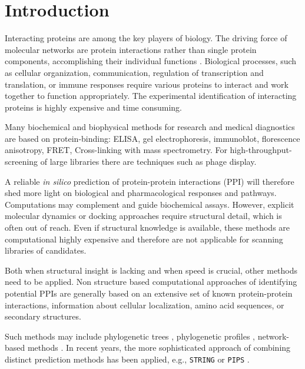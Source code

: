 \documentclass{bioinfo}
\begin{document}
\maketitle




\section{Introduction}

Interacting proteins are among the key players of biology. The driving
force of molecular networks are protein interactions rather than
single protein components, accomplishing their individual functions
\citep{Pawson:2004}. Biological processes, such as cellular
organization, communication, regulation of transcription and
translation, or immune responses require various proteins to interact
and work together to function appropriately. The experimental
identification of interacting proteins is highly expensive and time
consuming.

Many biochemical and biophysical methods for research and medical diagnostics are based on protein-binding:
ELISA,
gel electrophoresis, immunoblot, florescence anisotropy, FRET,
Cross-linking with mass spectrometry. For high-throughput-screening of
large libraries there are techniques such as phage display. 

A reliable \textit{in silico} prediction of protein-protein
interactions (PPI) will therefore shed more light on biological and
pharmacological responses and pathways. Computations may complement
and guide biochemical assays. However, explicit molecular dynamics or
docking approaches require structural detail, which is often out of
reach. Even if structural knowledge is available, these methods are
computational highly expensive and therefore are not applicable for
scanning libraries of candidates. 

Both when structural insight is lacking and when speed is crucial,
other methods need to be applied. Non structure based computational
approaches of identifying potential PPIs are generally based on an
extensive set of known protein-protein interactions, information about
cellular localization, amino acid sequences, or secondary structures.

Such methods may include phylogenetic trees \citep{Pazos:2001},
phylogenetic profiles \citep{Barker:2005}, network-based methods
\citep{Yook:2004, Clauset:2008}. In recent years, the more
sophisticated approach of combining distinct prediction methods has
been applied, e.g., \texttt{STRING} \citep{Szklarczyk:2011} or
\texttt{PIPS} \citep{McDowall:2009}.
\end{document}
